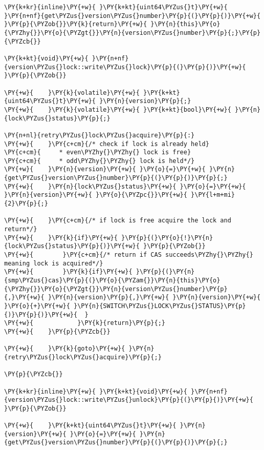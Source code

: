 \begin{Verbatim}[commandchars=\\\{\},codes={\catcode`\$=3\catcode`\^=7\catcode`\_=8\relax}]
\PY{k+kr}{inline}\PY{+w}{ }\PY{k+kt}{uint64\PYZus{}t}\PY{+w}{ }\PY{n+nf}{get\PYZus{}version\PYZus{}number}\PY{p}{(}\PY{p}{)}\PY{+w}{ }\PY{p}{\PYZob{}}\PY{k}{return}\PY{+w}{ }\PY{n}{this}\PY{o}{\PYZhy{}}\PY{o}{\PYZgt{}}\PY{n}{version\PYZus{}number}\PY{p}{;}\PY{p}{\PYZcb{}}

\PY{k+kt}{void}\PY{+w}{ }\PY{n+nf}{version\PYZus{}lock::write\PYZus{}lock}\PY{p}{(}\PY{p}{)}\PY{+w}{ }\PY{p}{\PYZob{}}

\PY{+w}{    }\PY{k}{volatile}\PY{+w}{ }\PY{k+kt}{uint64\PYZus{}t}\PY{+w}{ }\PY{n}{version}\PY{p}{;}
\PY{+w}{    }\PY{k}{volatile}\PY{+w}{ }\PY{k+kt}{bool}\PY{+w}{ }\PY{n}{lock\PYZus{}status}\PY{p}{;}

\PY{n+nl}{retry\PYZus{}lock\PYZus{}acquire}\PY{p}{:}
\PY{+w}{    }\PY{c+cm}{/* check if lock is already held}
\PY{c+cm}{     * even\PYZhy{}\PYZhy{} lock is free}
\PY{c+cm}{     * odd\PYZhy{}\PYZhy{} lock is held*/}
\PY{+w}{    }\PY{n}{version}\PY{+w}{ }\PY{o}{=}\PY{+w}{ }\PY{n}{get\PYZus{}version\PYZus{}number}\PY{p}{(}\PY{p}{)}\PY{p}{;}
\PY{+w}{    }\PY{n}{lock\PYZus{}status}\PY{+w}{ }\PY{o}{=}\PY{+w}{ }\PY{n}{version}\PY{+w}{ }\PY{o}{\PYZpc{}}\PY{+w}{ }\PY{l+m+mi}{2}\PY{p}{;}

\PY{+w}{    }\PY{c+cm}{/* if lock is free acquire the lock and return*/}
\PY{+w}{    }\PY{k}{if}\PY{+w}{ }\PY{p}{(}\PY{o}{!}\PY{n}{lock\PYZus{}status}\PY{p}{)}\PY{+w}{ }\PY{p}{\PYZob{}}
\PY{+w}{        }\PY{c+cm}{/* return if CAS succeeds\PYZhy{}\PYZhy{} meaning lock is acquired*/}
\PY{+w}{        }\PY{k}{if}\PY{+w}{ }\PY{p}{(}\PY{n}{smp\PYZus{}cas}\PY{p}{(}\PY{o}{\PYZam{}}\PY{n}{this}\PY{o}{\PYZhy{}}\PY{o}{\PYZgt{}}\PY{n}{version\PYZus{}number}\PY{p}{,}\PY{+w}{ }\PY{n}{version}\PY{p}{,}\PY{+w}{ }\PY{n}{version}\PY{+w}{ }\PY{o}{+}\PY{+w}{ }\PY{n}{SWITCH\PYZus{}LOCK\PYZus{}STATUS}\PY{p}{)}\PY{p}{)}\PY{+w}{  }
\PY{+w}{            }\PY{k}{return}\PY{p}{;}
\PY{+w}{    }\PY{p}{\PYZcb{}}

\PY{+w}{    }\PY{k}{goto}\PY{+w}{ }\PY{n}{retry\PYZus{}lock\PYZus{}acquire}\PY{p}{;}

\PY{p}{\PYZcb{}}

\PY{k+kr}{inline}\PY{+w}{ }\PY{k+kt}{void}\PY{+w}{ }\PY{n+nf}{version\PYZus{}lock::write\PYZus{}unlock}\PY{p}{(}\PY{p}{)}\PY{+w}{ }\PY{p}{\PYZob{}}

\PY{+w}{    }\PY{k+kt}{uint64\PYZus{}t}\PY{+w}{ }\PY{n}{version}\PY{+w}{ }\PY{o}{=}\PY{+w}{ }\PY{n}{get\PYZus{}version\PYZus{}number}\PY{p}{(}\PY{p}{)}\PY{p}{;}


\end{Verbatim}
